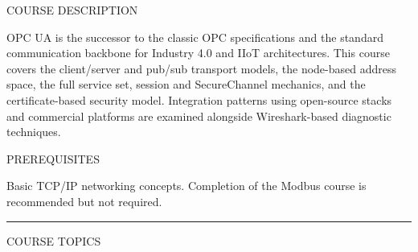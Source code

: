 \documentclass[10pt]{article}
\begin{document}

\vspace{0.70in}

{\small\sffamily\color{ugray}\MakeUppercase{Course Description}}
\smallskip

{\small OPC UA is the successor to the classic OPC specifications and the standard communication backbone for Industry 4.0 and IIoT architectures. This course covers the client/server and pub/sub transport models, the node-based address space, the full service set, session and SecureChannel mechanics, and the certificate-based security model. Integration patterns using open-source stacks and commercial platforms are examined alongside Wireshark-based diagnostic techniques.}

\smallskip
{\small\sffamily\color{ugray}\MakeUppercase{Prerequisites}}
\smallskip

{\small Basic TCP/IP networking concepts. Completion of the Modbus course is recommended but not required.}

\smallskip
{\color{unavy}\rule{\linewidth}{1.2pt}}
\smallskip
{\small\sffamily\color{ugray}\MakeUppercase{Course Topics}}
\smallskip
\end{document}
